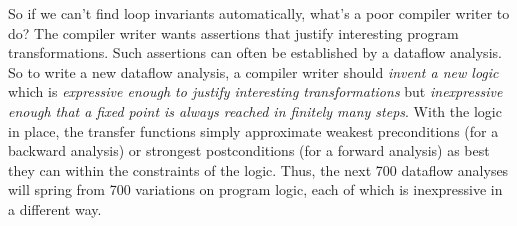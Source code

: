 \documentclass[blockstyle,preprint,nocopyrightspace]{sigplanconf}
\newcommand\join{\sqcup}
\newcommand\true{\ensuremath{\mathbf{true}}}
\newcommand\implies{\supseteq}  %
\newcommand{\authornote}[1]{{\em #1}}
\def\authornote#1{\unskip\relax}
\newcommand{\norman}[1]{\authornote{NR: #1}}
\let\remark\norman
\newcommand\secref[1]{Section~\ref{sec:#1}}
\begin{document}


So if we can't find loop invariants automatically, what's a poor
compiler writer to do?
The compiler writer wants assertions that justify interesting program
transformations. 
Such assertions can often be established by a dataflow analysis.
So to write a new dataflow analysis, a compiler writer
should \emph{invent a new logic} which is
\emph{expressive enough to justify interesting transformations}
but \emph{inexpressive enough that a fixed point
  is always reached in finitely many steps}.
With the logic in place, the transfer functions simply approximate
  weakest preconditions (for a backward analysis) or strongest
  postconditions (for a forward analysis) as best they can within the
  constraints of the logic.
Thus, the next 700 dataflow analyses will spring from 700 variations on
program logic, each of which is inexpressive in a different way.
\remark{Do we have examples or not?}

\end{document}
